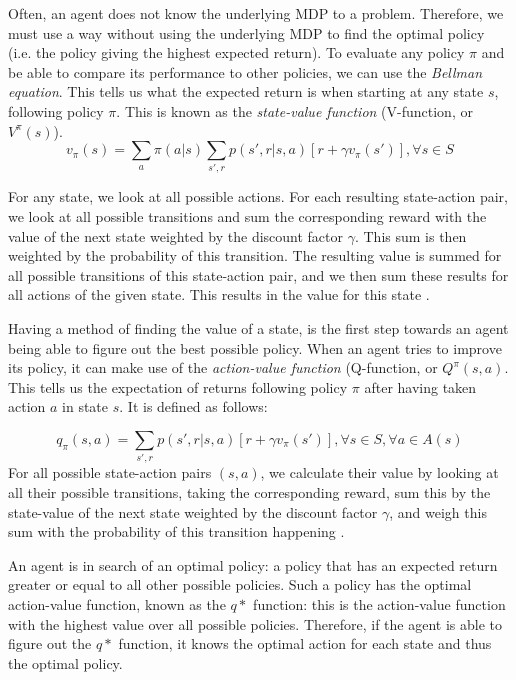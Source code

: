Often, an agent does not know the underlying MDP to a problem. Therefore, we must use a way without using the underlying MDP to find the optimal policy (i.e. the policy giving the highest expected return). To evaluate any policy ${\pi}$ and be able to compare its performance to other policies, we can use the \emph{Bellman equation}. This tells us what the expected return is when starting at any state $s$, following policy $\pi$. This is known as the \emph{state-value function} (V-function, or $V^{\pi}(s)$).
\begin{equation}
v_\pi (s) = \sum_{a} \pi (a|s) \sum_{s', r} p(s', r|s,a)[r + \gamma v_\pi (s')], \forall s \in S
\end{equation} 

For any state, we look at all possible actions. For each resulting state-action pair, we look at all possible transitions and sum the corresponding reward with the value of the next state weighted by the discount factor $\gamma$. This sum is then weighted by the probability of this transition. The resulting value is summed for all possible transitions of this state-action pair, and we then sum these results for all actions of the given state. This results in the value for this state \cite[p. 73]{grokking}.

Having a method of finding the value of a state, is the first step towards an agent being able to figure out the best possible policy. When an agent tries to improve its policy, it can make use of the \emph{action-value function} (Q-function, or $Q^\pi (s, a)$. This tells us the expectation of returns following policy $\pi$ after having taken action $a$ in state $s$. It is defined as follows:

\begin{equation}
q_\pi (s,a) = \sum_{s', r} p(s', r|s,a)[r + \gamma v_\pi (s')], \forall s \in S, \forall a \in A(s)
\end{equation}
For all possible state-action pairs $(s,a)$, we calculate their value by looking at all their possible transitions, taking the corresponding reward, sum this by the state-value of the next state weighted by the discount factor $\gamma$, and weigh this sum with the probability of this transition happening \cite[p. 74]{grokking}.

An agent is in search of an optimal policy: a policy that has an expected return greater or equal to all other possible policies. Such a policy has the optimal action-value function, known as the $q*$ function: this is the action-value function with the highest value over all possible policies. Therefore, if the agent is able to figure out the $q*$ function, it knows the optimal action for each state and thus the optimal policy. 

